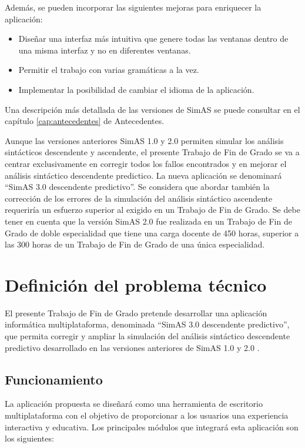 Además, se pueden incorporar las siguientes mejoras para enriquecer la aplicación:

\begin{itemize}
    \item Diseñar una interfaz más intuitiva que genere todas las ventanas dentro de una misma interfaz y no en diferentes ventanas.
    \item Permitir el trabajo con varias gramáticas a la vez. 
    \item Implementar la posibilidad de cambiar el idioma de la aplicación.
\end{itemize}

Una descripción más detallada de las versiones de SimAS se puede consultar en el capítulo \ref{cap:antecedentes} de Antecedentes.


Aunque las versiones anteriores SimAS 1.0  y 2.0 permiten simular los análisis sintácticos descendente y ascendente, el presente Trabajo de Fin de Grado se va a centrar exclusivamente en corregir todos los fallos encontrados y en mejorar el análisis sintáctico descendente predictico. La nueva aplicación se denominará ``SimAS 3.0 descendente predictivo''. Se considera que abordar también la corrección de los errores de la simulación del análisis sintáctico ascendente requeriría un esfuerzo superior al exigido en un Trabajo de Fin de Grado. Se debe tener en cuenta que la versión SimAS 2.0 \cite{juan} fue realizada en un Trabajo de Fin de Grado de doble especialidad que tiene una carga docente de 450 horas, superior a las 300 horas de un Trabajo de Fin de Grado de una única especialidad.


\section{Definición del problema técnico}


El presente Trabajo de Fin de Grado pretende desarrollar una aplicación informática multiplataforma, denominada ``SimAS 3.0 descendente predictivo'', que permita corregir y ampliar la simulación del análisis sintáctico descendente predictivo desarrollado en las versiones anteriores de SimAS 1.0 \cite{vanesa} y 2.0 \cite{juan}.

\subsection{Funcionamiento}
La aplicación propuesta se diseñará como una herramienta de escritorio multiplataforma con el objetivo de proporcionar a los usuarios una experiencia interactiva y educativa. Los principales módulos que integrará esta aplicación son los siguientes:

